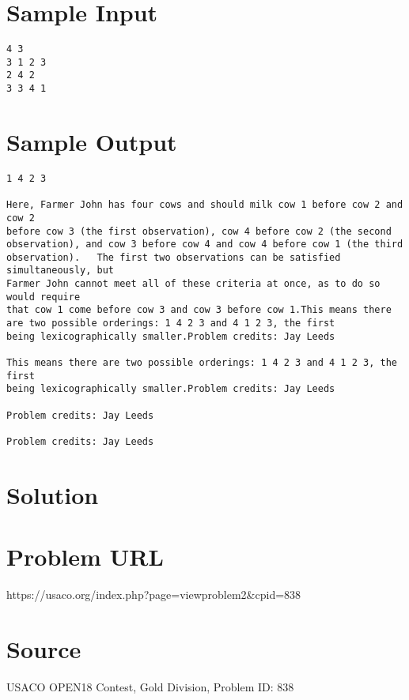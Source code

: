 \documentclass[12pt]{article}
\begin{document}
\section*{Sample Input}
\begin{verbatim}
4 3
3 1 2 3
2 4 2
3 3 4 1
\end{verbatim}

\section*{Sample Output}
\begin{verbatim}
1 4 2 3

Here, Farmer John has four cows and should milk cow 1 before cow 2 and cow 2
before cow 3 (the first observation), cow 4 before cow 2 (the second
observation), and cow 3 before cow 4 and cow 4 before cow 1 (the third
observation).   The first two observations can be satisfied simultaneously, but
Farmer John cannot meet all of these criteria at once, as to do so would require
that cow 1 come before cow 3 and cow 3 before cow 1.This means there are two possible orderings: 1 4 2 3 and 4 1 2 3, the first
being lexicographically smaller.Problem credits: Jay Leeds

This means there are two possible orderings: 1 4 2 3 and 4 1 2 3, the first
being lexicographically smaller.Problem credits: Jay Leeds

Problem credits: Jay Leeds

Problem credits: Jay Leeds
\end{verbatim}

\section*{Solution}


\section*{Problem URL}
https://usaco.org/index.php?page=viewproblem2&cpid=838

\section*{Source}
USACO OPEN18 Contest, Gold Division, Problem ID: 838
\end{document}
